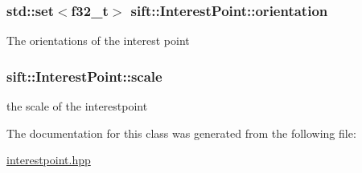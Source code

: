 \subsubsection[{orientation}]{\setlength{\rightskip}{0pt plus 5cm}std\+::set$<${\bf f32\+\_\+t}$>$ sift\+::\+Interest\+Point\+::orientation}\label{classsift_1_1InterestPoint_adbf265440c475aad71f31d8e81306a8b}
The orientations of the interest point \hypertarget{classsift_1_1InterestPoint_abcdd744160459cfbd2330b5d6b8a2926}{}
\subsubsection[{scale}]{ sift\+::\+Interest\+Point\+::scale}\label{classsift_1_1InterestPoint_abcdd744160459cfbd2330b5d6b8a2926}
the scale of the interestpoint 

The documentation for this class was generated from the following file\+:\begin{DoxyCompactItemize}
\item 
\hyperlink{interestpoint_8hpp}{interestpoint.\+hpp}\end{DoxyCompactItemize}
